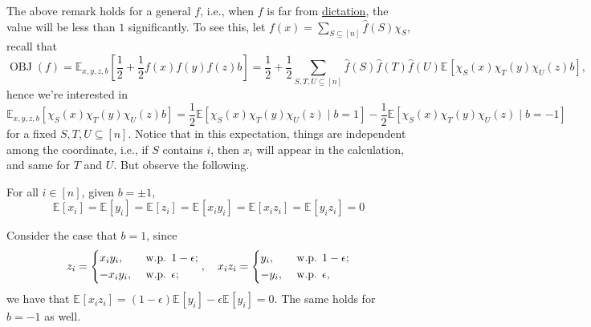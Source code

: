 The above remark holds for a general \(f\), i.e., when \(f\) is far from \hyperref[not:dictation]{dictation}, the value will be less than \(1\) significantly. To see this, let \(f(x) = \sum_{S \subseteq [n]} \hat{f} (S)\chi _S\), recall that
\[
	\mathop{\mathrm{OBJ}}(f)
	= \mathbb{E}_{x, y, z, b}\left[\frac{1}{2} + \frac{1}{2} f(x) f(y) f(z) b \right]
	= \frac{1}{2} + \frac{1}{2} \sum_{S, T, U \subseteq [n]} \hat{f} (S) \hat{f} (T) \hat{f} (U) \mathbb{E}_{}\left[\chi _S(x) \chi _T(y) \chi _U(z) b \right],
\]
hence we're interested in
\[
	\mathbb{E}_{x, y, z, b}\left[\chi _S(x) \chi _T(y) \chi _U (z) b \right]
	= \frac{1}{2} \mathbb{E}\left[\chi _S(x) \chi _T(y) \chi _U (z) \mid b=1\right] - \frac{1}{2} \mathbb{E}\left[\chi _S(x) \chi _T(y) \chi _U (z) \mid b=-1\right]
\]
for a fixed \(S, T, U \subseteq [n]\). Notice that in this expectation, things are independent among the coordinate, i.e., if \(S\) contains \(i\), then \(x_i\) will appear in the calculation, and same for \(T\) and \(U\). But observe the following.

\begin{claim}
	For all \(i\in [n]\), given \(b = \pm 1\),
	\[
		\mathbb{E}_{}\left[x_i \right]
		= \mathbb{E}_{}\left[y_i \right]
		= \mathbb{E}_{}\left[z_i \right]
		= \mathbb{E}_{}\left[x_i y_i \right]
		= \mathbb{E}_{}\left[x_i z_i \right]
		= \mathbb{E}_{}\left[y_i z_i \right]
		= 0
	\]
\end{claim}
\begin{explanation}
	Consider the case that \(b = 1\), since
	\[
		z_i = \begin{dcases}
			x_i y_i,  & \text{ w.p. } 1-\epsilon  ; \\
			-x_i y_i, & \text{ w.p. } \epsilon  ;
		\end{dcases},\quad x_i z_i = \begin{dcases}
			y_i,  & \text{ w.p. } 1-\epsilon  ; \\
			-y_i, & \text{ w.p. } \epsilon  ,
		\end{dcases}
	\]
	we have that \(\mathbb{E}_{}\left[x_i z_i \right] = (1 - \epsilon ) \mathbb{E}_{}\left[y_i \right] - \epsilon \mathbb{E}_{}\left[y_i \right] = 0\). The same holds for \(b = -1\) as well.
\end{explanation}

